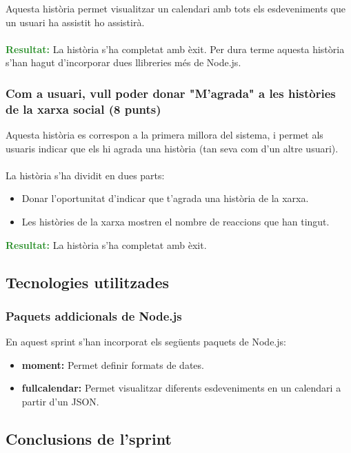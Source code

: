 \documentclass[11pt,catalan,listoffigures,listoftables]{tfgetsinf}
\begin{document}
Aquesta història permet visualitzar un calendari amb tots els esdeveniments que un usuari ha assistit ho assistirà.\\ \\
\textcolor{forestgreen}{\textbf{Resultat:}} La història s'ha completat amb èxit. Per dura terme aquesta història s'han hagut d'incorporar dues llibreries més de Node.js.

\subsubsection{Com a usuari, vull poder donar "M'agrada" a les històries de la xarxa social (8 punts)}

Aquesta història es correspon a la primera millora del sistema, i permet als usuaris indicar que els hi agrada una història (tan seva com d'un altre usuari).\\ \\
La història s'ha dividit en dues parts:
\begin{itemize}
\item Donar l'oportunitat d'indicar que t'agrada una història de la xarxa.
\item Les històries de la xarxa mostren el nombre de reaccions que han tingut.
\end{itemize}
\textcolor{forestgreen}{\textbf{Resultat:}} La història s'ha completat amb èxit.

\subsection{Tecnologies utilitzades}

\subsubsection{Paquets addicionals de Node.js}

En aquest sprint s'han incorporat els següents paquets de Node.js:
\begin{itemize}
\item \textbf{moment:} Permet definir formats de dates.
\item \textbf{fullcalendar:} Permet visualitzar diferents esdeveniments en un calendari a partir d'un JSON.
\end{itemize}

\subsection{Conclusions de l'sprint}
\end{document}
